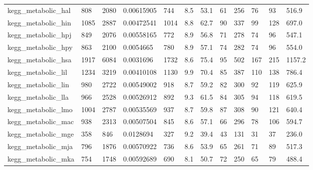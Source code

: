 \begin{longtable}{llllllllllll}
 kegg\_metabolic\_hal                                 & 808        & 2080      & 0.00615905  & 744   & 8.5    & 53.1   & 61    & 256    & 76     & 93     & 516.9   \\
 kegg\_metabolic\_hin                                 & 1085       & 2887      & 0.00472541  & 1014  & 8.8    & 62.7   & 90    & 337    & 99     & 128    & 697.0   \\
 kegg\_metabolic\_hpj                                 & 849        & 2076      & 0.00558165  & 772   & 8.9    & 56.8   & 71    & 278    & 74     & 96     & 547.1   \\
 kegg\_metabolic\_hpy                                 & 863        & 2100      & 0.0054665   & 780   & 8.9    & 57.1   & 74    & 282    & 74     & 96     & 554.0   \\
 kegg\_metabolic\_hsa                                 & 1917       & 6084      & 0.0031696   & 1732  & 8.6    & 75.4   & 95    & 502    & 167    & 215    & 1157.2  \\
 kegg\_metabolic\_lil                                 & 1234       & 3219      & 0.00410108  & 1130  & 9.9    & 70.4   & 85    & 387    & 110    & 138    & 786.4   \\
 kegg\_metabolic\_lin                                 & 980        & 2722      & 0.00549002  & 918   & 8.7    & 59.2   & 82    & 300    & 92     & 119    & 625.9   \\
 kegg\_metabolic\_lla                                 & 966        & 2528      & 0.00526912  & 892   & 9.3    & 61.5   & 84    & 305    & 94     & 118    & 619.5   \\
 kegg\_metabolic\_lmo                                 & 1004       & 2787      & 0.00535569  & 937   & 8.7    & 59.8   & 87    & 308    & 90     & 121    & 640.4   \\
 kegg\_metabolic\_mac                                 & 938        & 2313      & 0.00507504  & 845   & 8.6    & 57.1   & 66    & 296    & 78     & 106    & 594.7   \\
 kegg\_metabolic\_mge                                 & 358        & 846       & 0.0128694   & 327   & 9.2    & 39.4   & 43    & 131    & 31     & 37     & 236.0   \\
 kegg\_metabolic\_mja                                 & 796        & 1876      & 0.00570922  & 736   & 8.6    & 53.9   & 65    & 261    & 71     & 89     & 517.3   \\
 kegg\_metabolic\_mka                                 & 754        & 1748      & 0.00592689  & 690   & 8.1    & 50.7   & 72    & 250    & 65     & 79     & 488.4   \\

\end{longtable}
